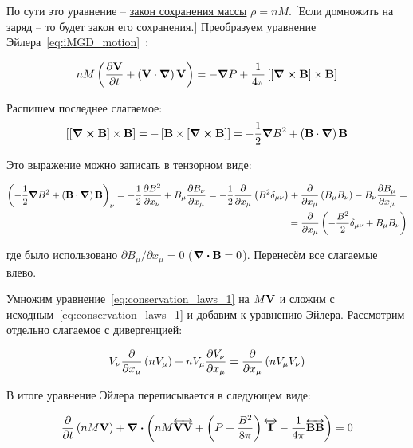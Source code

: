 \documentclass[10pt, a4paper]{article}
\begin{document}
По сути это уравнение -- \uline{закон сохранения массы} $\rho = nM$. [Если домножить на заряд -- то будет закон его сохранения.]
Преобразуем уравнение Эйлера~\eqref{eq:iMGD_motion}~\cite{kotelnikov}:

\begin{equation*}
	n M \left( \pdv{\vb{V}}{t} + \left( \vb{V}\cdot\grad \right)\vb{V} \right) = -\grad{P} + \frac{1}{4\pi}\left[\left[ \curl{\vb{B}} \right]\times\vb{B}\right]
\end{equation*}

Распишем последнее слагаемое:
\begin{equation*}
	\left[\left[ \curl{\vb{B}} \right]\times\vb{B}\right] = -\left[\vb{B}\times\left[ \curl{\vb{B}} \right]\right] = -\frac{1}{2}\grad{B^2} + \left( \vb{B} \cdot\grad \right)\vb{B}
\end{equation*}

Это выражение можно записать в тензорном виде:

\begin{equation*}
	\begin{split}
		\left( -\frac{1}{2}\grad{B^2} + \left( \vb{B} \cdot\grad \right)\vb{B} \right)_\nu = -\frac{1}{2}\pdv{B^2}{x_\nu} + B_\mu\pdv{B_\nu}{x_\mu}= -\frac{1}{2}\pdv{}{x_\mu}\left( B^2 \delta_{\mu\nu} \right) + \pdv{}{x_\mu}\left( B_\mu B_\nu \right) - B_\nu\pdv{B_\mu}{x_\mu} =\\= \pdv{}{x_\mu}\left( -\frac{B^2}{2} \delta_{\mu\nu} + B_\mu B_\nu \right)
	\end{split}
\end{equation*}

где было использовано $\partial B_\mu/\partial x_\mu = 0$ ($\div{\vb{B}}=0$). Перенесём все слагаемые влево.

Умножим уравнение~\eqref{eq:conservation_laws_1} на $M\vb{V}$ и сложим с исходным~\eqref{eq:conservation_laws_1} и добавим к уравнению Эйлера. Рассмотрим отдельно слагаемое с дивергенцией:

\begin{equation*}
	V_\nu \pdv{}{x_\mu}\left( nV_\mu \right) + nV_\mu\pdv{V_\nu}{x_\mu} = \pdv{}{x_\mu}\left( nV_\mu V_\nu \right)
\end{equation*}

В итоге уравнение Эйлера переписывается в следующем виде:

\begin{equation*}
	\pdv{}{t}\left( nM\vb{V} \right) + \div{\left( nM\overleftrightarrow{\vb{VV}} + \left( P + \frac{B^2}{8\pi} \right)\overleftrightarrow{\vb{I}} - \frac{1}{4\pi}\overleftrightarrow{\vb{BB}} \right)} = 0
\end{equation*}
\end{document}
